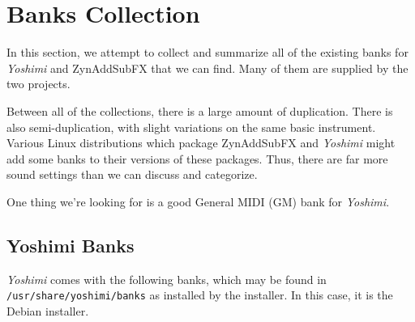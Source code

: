 %
%
%

\section{Banks Collection}
\label{sec:banks_collection}

   In this section, we attempt to collect and summarize all of the existing
   banks for \textsl{Yoshimi} and ZynAddSubFX that we can find.  Many of them
   are supplied by the two projects.

   Between all of the collections, there is a large amount of duplication.
   There is also semi-duplication, with slight variations on the same basic
   instrument.
   Various Linux distributions which package ZynAddSubFX and \textsl{Yoshimi}
   might add some banks to their versions of these packages.
   Thus, there are far more sound settings than we can discuss and categorize.

   One thing we're looking for is a good General MIDI (GM) bank for
   \textsl{Yoshimi}.

\subsection{Yoshimi Banks}
\label{subsec:banks_collection_yoshimi}

   \textsl{Yoshimi} comes with the following banks, which may be found in
   \texttt{/usr/share/yoshimi/banks} as installed by the installer.  In this
   case, it is the Debian installer.

